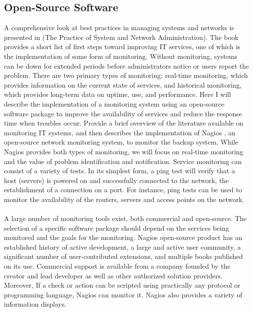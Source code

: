 \documentclass[english]{tktltiki2}
\theoremstyle{definition}
\theoremstyle{remark}
\begin{document}
\subsection{Open-Source Software}
A comprehensive look at best practices in managing systems and networks is presented in  \cite{limoncelli2016practice} (The Practice of System and Network Administration).  The book provides a short list of first steps toward improving IT services, one of which is the implementation of some form of monitoring. Without monitoring, systems can be down for extended periods before administrators notice or users report the problem.   There are two primary types of monitoring: real-time
monitoring, which provides information on the current
state of services, and historical monitoring, which provides long-term data on uptime, use, and performance. 
Here  I will describe the implementation of a monitoring system using an open-source software package to improve the availability of services and reduce the response time when troubles occur. Provide a brief overview of the literature available on monitoring IT systems, and then
describes the implementation of Nagios \cite{nagios}, an open-source network monitoring system, to monitor the backup system.
While Nagios provides both types of monitoring, we will focus on real-time monitoring and the value of problem identification and notification.
Service monitoring can consist of a variety of tests. In its simplest form, a ping test will verify that a host (servers) is powered on and successfully connected to the network, the establishment of a connection on a port. For instance, ping tests  can be used to monitor the availability of the routers, servers and access points on the network. \\ \\ 
A large number of monitoring tools exist, both commercial and open-source.  The selection of a specific software package should depend on the services being monitored and the goals for the monitoring.
 Nagios open-source product \cite{nagios} has an established history of active development, a large and active user community, a significant number of user-contributed extensions, and multiple books published on its use. Commercial support is available from a company founded by the creator and lead developer as well as other authorized solution providers. Moreover, If a check or action can be scripted using practically any protocol or programming language, Nagios can monitor it. Nagios also provides a variety of information displays.\\ \\
\end{document}
